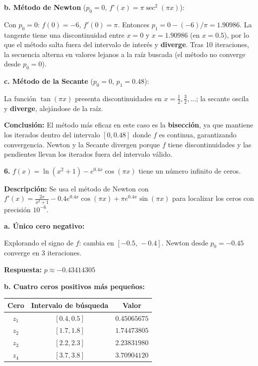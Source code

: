 \documentclass[12pt,a4paper]{article}
\begin{document}
\textbf{b. M\'etodo de Newton} ($p_0 = 0$, $f'(x) = \pi\sec^2(\pi x)$):

Con $p_0 = 0$: $f(0) = -6$, $f'(0) = \pi$. Entonces $p_1 = 0 - (-6)/\pi = 1.90986$. La tangente tiene una discontinuidad entre $x=0$ y $x=1.90986$ (en $x=0.5$), por lo que el m\'etodo salta fuera del intervalo de inter\'es y \textbf{diverge}. Tras 10 iteraciones, la secuencia alterna en valores lejanos a la ra\'iz buscada (el m\'etodo no converge desde $p_0=0$).

\textbf{c. M\'etodo de la Secante} ($p_0 = 0$, $p_1 = 0.48$):

La funci\'on $\tan(\pi x)$ presenta discontinuidades en $x = \frac{1}{2}, \frac{3}{2}, \ldots$; la secante oscila y \textbf{diverge}, alejándose de la ra\'iz.

\textbf{Conclusi\'on:} El m\'etodo m\'as eficaz en este caso es la \textbf{bisecci\'on}, ya que mantiene los iterados dentro del intervalo $[0, 0.48]$ donde $f$ es continua, garantizando convergencia. Newton y la Secante divergen porque $f$ tiene discontinuidades y las pendientes llevan los iterados fuera del intervalo v\'alido.

\vspace{0.4cm}

\textbf{6.} $f(x) = \ln(x^2+1) - e^{0.4x}\cos(\pi x)$ tiene un n\'umero infinito de ceros.

\textbf{Descripci\'on:} Se usa el m\'etodo de Newton con $f'(x) = \frac{2x}{x^2+1} - 0.4e^{0.4x}\cos(\pi x) + \pi e^{0.4x}\sin(\pi x)$ para localizar los ceros con precisi\'on $10^{-6}$.

\textbf{a. \'Unico cero negativo:}

Explorando el signo de $f$: cambia en $[-0.5,\,-0.4]$. Newton desde $p_0 = -0.45$ converge en 3 iteraciones.

\textbf{Respuesta:} $p \approx \boxed{-0.43414305}$

\textbf{b. Cuatro ceros positivos m\'as peque\~nos:}

\begin{center}
\begin{tabular}{ccc}
\toprule
Cero & Intervalo de b\'usqueda & Valor \\
\midrule
$z_1$ & $[0.4, 0.5]$ & $0.45065675$ \\
$z_2$ & $[1.7, 1.8]$ & $1.74473805$ \\
$z_3$ & $[2.2, 2.3]$ & $2.23831980$ \\
$z_4$ & $[3.7, 3.8]$ & $3.70904120$ \\
\bottomrule
\end{tabular}
\end{center}
\end{document}
